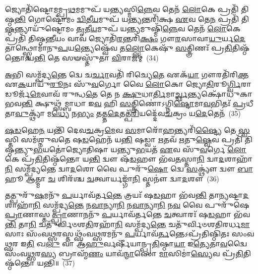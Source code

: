 {\anuvakamend[{𑌤 𑌏\-\ul{𑌕𑌾}\-𑌨𑍍𑌨𑌪᳴\-\ul{𑌞𑍍𑌚𑌾}\-𑌶𑌚𑍍𑌚᳴}]}%

𑌜𑍍𑌯𑍋𑌤𑌿᳴𑌷𑍍𑌟𑍋𑌮𑌮𑍍𑌪𑍍𑌰\-\ul{𑌥}\-𑌮𑌮𑍁𑌪᳴ 𑌯\-\ul{𑌨𑍍𑌤𑍍𑌯}\-𑌸𑍍𑌮𑌿\-\ul{𑌨𑍍𑌨𑍇}\-𑌵 𑌤𑍇𑌨᳴ \ul{𑌲𑍋}\-𑌕𑍇 𑌪𑍍𑌰𑌤𑌿᳴ 𑌤𑌿𑌷𑍍𑌠\-\ul{𑌨𑍍𑌤𑌿} 𑌗𑍋𑌷𑍍𑌟𑍋᳴𑌮𑌂 \ul{𑌦𑍍𑌵𑌿}\-𑌤𑍀\-\ul{𑌯}\-𑌮𑍁𑌪᳴ 𑌯\-\ul{𑌨𑍍𑌤𑍍𑌯}\-𑌨𑍍𑌤𑌰𑌿᳴𑌕𑍍𑌷 \ul{𑌏}\-𑌵 𑌤𑍇\-\ul{𑌨} 𑌪𑍍𑌰𑌤𑌿᳴ 𑌤𑌿\-\ul{𑌷𑍍𑌠}\-𑌨𑍍𑌤𑍍𑌯𑌾𑌯𑍁᳴𑌷𑍍𑌟𑍋𑌮𑌂 \ul{𑌤𑍃}\-𑌤𑍀\-\ul{𑌯}\-𑌮𑍁𑌪᳴ 𑌯\-\ul{𑌨𑍍𑌤𑍍𑌯}\-𑌮𑍁𑌷𑍍𑌮𑌿᳴\-\ul{𑌨𑍍𑌨𑍇}\-𑌵 𑌤𑍇𑌨᳴ \ul{𑌲𑍋}\-𑌕𑍇 𑌪𑍍𑌰𑌤𑌿᳴ 𑌤𑌿𑌷𑍍𑌠\-\ul{𑌨𑍍𑌤𑍀}\-𑌯𑌂 𑌵𑌾𑌵 𑌜𑍍𑌯𑍋𑌤𑌿᳴\-\ul{𑌰}\-𑌨𑍍𑌤𑌰𑌿᳴\-\ul{𑌕𑍍𑌷𑌂} 𑌗𑍗\-\ul{𑌰}\-𑌸𑌾𑌵𑌾\-\ul{𑌯𑍁}\-𑌰𑍍𑌯\-\ul{𑌦𑍇}\-𑌤𑌾𑌨𑍍𑌥𑍍𑌸𑍍𑌤𑍋𑌮𑌾᳴𑌨𑍁\-\ul{𑌪}\-𑌯\-\ul{𑌨𑍍𑌤𑍍𑌯𑍇}\-𑌷𑍍𑌵𑍇᳴𑌵 𑌤\-\ul{𑌲𑍍𑌲𑍋}\-𑌕𑍇𑌷𑍁᳴ \ul{𑌸}\-𑌤𑍍𑌤𑍍𑌰𑌿𑌣𑌃᳴ 𑌪𑍍𑌰\-\ul{𑌤𑌿}\-𑌤𑌿𑌷𑍍𑌠᳴𑌨𑍍𑌤𑍋 𑌯\-\ul{𑌨𑍍𑌤𑌿} 𑌤𑍇 𑌸𑍟𑌸𑍍𑌤𑍁᳴𑌤𑌾 \ul{𑌵𑌿}\-𑌰𑌾𑌜𑌮𑍍॑~(34)

\-\ul{𑌅}\-𑌭𑌿 𑌸𑌮𑍍𑌪᳴𑌦𑍍𑌯\-\ul{𑌨𑍍𑌤𑍇} 𑌦𑍍𑌵𑍇 𑌚\-\ul{𑌰𑍍𑌚𑌾}\-𑌵𑌤𑌿᳴ 𑌰𑌿𑌚𑍍𑌯𑍇\-\ul{𑌤𑍇} 𑌏𑌕᳴\-\ul{𑌯𑌾} 𑌗𑍗𑌰𑌤𑌿᳴𑌰𑌿\-\ul{𑌕𑍍𑌤} 𑌏\-\ul{𑌕}\-𑌯𑌾𑌯𑍁᳴\-\ul{𑌰𑍂}\-𑌨𑌃 𑌸𑍁᳴\-\ul{𑌵}\-𑌰𑍍𑌗𑍋 𑌵𑍈 \ul{𑌲𑍋}\-𑌕𑍋 𑌜𑍍𑌯𑍋\-\ul{𑌤𑌿}\-𑌰𑍂\-\ul{𑌰𑍍𑌗𑍍𑌵𑌿}\-𑌰𑌾𑌡𑍂𑌰𑍍𑌜᳴\-\ul{𑌮𑍇}\-𑌵𑌾𑌵᳴ 𑌰𑍁𑌨𑍍𑌧\-\ul{𑌤𑍇} 𑌤𑍇 𑌨 \ul{𑌕𑍍𑌷𑍁}\-𑌧𑌾\-\ul{𑌰𑍍𑌤𑌿}\-𑌮𑌾\-\ul{𑌰𑍍𑌚𑍍𑌛}\-𑌨𑍍𑌤𑍍𑌯𑌕𑍍𑌷𑍋᳴𑌧𑍁𑌕𑌾 𑌭𑌵\-\ul{𑌨𑍍𑌤𑌿} 𑌕𑍍𑌷𑍁𑌥𑍍𑌸᳴𑌮𑍍𑌬𑌾𑌧𑌾 𑌇\-\ul{𑌵} 𑌹𑌿 \ul{𑌸}\-𑌤𑍍𑌤𑍍𑌰𑌿𑌣𑍋॑\-𑌽𑌗𑍍𑌨𑌿\-\ul{𑌷𑍍𑌟𑍋}\-𑌮𑌾\-\ul{𑌵}\-𑌭𑌿𑌤𑌃᳴ \ul{𑌪𑍍𑌰}\-𑌧𑍀 𑌤𑌾\-\ul{𑌵𑍁}\-𑌕𑍍𑌥𑍍𑌯𑌾᳴ 𑌮\-\ul{𑌧𑍍𑌯𑍇} 𑌨\-\ul{𑌭𑍍𑌯𑌂} 𑌤𑌤𑍍𑌤\-\ul{𑌦𑍇}\-𑌤𑌤𑍍𑌪᳴\-\ul{𑌰𑌿}\-𑌯𑌦𑍍𑌦𑍇᳴𑌵\-\ul{𑌚}\-𑌕𑍍𑌰𑌂 𑌯\-\ul{𑌦𑍇}\-𑌤𑍇𑌨᳴~(35)

\-\ul{𑌷}\-\-\ul{𑌡}\-𑌹𑍇\-\ul{𑌨} 𑌯𑌨𑍍𑌤𑌿᳴ 𑌦𑍇𑌵\-\ul{𑌚}\-𑌕𑍍𑌰\-\ul{𑌮𑍇}\-𑌵 \ul{𑌸}\-𑌮𑌾𑌰𑍋᳴\-\ul{𑌹}\-𑌨𑍍𑌤𑍍𑌯𑌰𑌿᳴\-\ul{𑌷𑍍𑌟𑍍𑌯𑍈} 𑌤𑍇 \ul{𑌸𑍍𑌵}\-𑌸𑍍𑌤𑌿 𑌸𑌮᳴𑌶𑍍𑌨𑍁𑌵𑌤𑍇 𑌷\-\ul{𑌡}\-𑌹𑍇𑌨᳴ 𑌯\-\ul{𑌨𑍍𑌤𑌿} 𑌷𑌡𑍍𑌵𑌾 \ul{𑌋}\-𑌤𑌵᳴ \ul{𑌋}\-𑌤𑍁\-\ul{𑌷𑍍𑌵𑍇}\-𑌵 𑌪𑍍𑌰𑌤𑌿᳴ 𑌤𑌿𑌷𑍍𑌠𑌨𑍍𑌤𑍍𑌯𑍁\-\ul{𑌭}\-𑌯𑌤𑍋॑𑌜𑍍𑌯𑍋𑌤𑌿𑌷𑌾 𑌯𑌨𑍍𑌤𑍍𑌯𑍁\-\ul{𑌭}\-𑌯𑌤᳴ \ul{𑌏}\-𑌵 𑌸𑍁᳴\-\ul{𑌵}\-𑌰𑍍𑌗𑍇 \ul{𑌲𑍋}\-𑌕𑍇 𑌪𑍍𑌰᳴\-\ul{𑌤𑌿}\-𑌤𑌿𑌷𑍍𑌠᳴𑌨𑍍𑌤𑍋 𑌯\-\ul{𑌨𑍍𑌤𑌿} 𑌦𑍍𑌵𑍗 𑌷᳴\-\ul{𑌡}\-𑌹𑍗 𑌭᳴𑌵\-\ul{𑌤}\-𑌸𑍍𑌤𑌾\-\ul{𑌨𑌿} 𑌦𑍍𑌵𑌾\-\ul{𑌦}\-𑌶𑌾𑌹𑌾᳴\-\ul{𑌨𑌿} 𑌸𑌮𑍍𑌪᳴𑌦𑍍𑌯𑌨𑍍𑌤𑍇 𑌦𑍍𑌵𑌾\-\ul{𑌦}\-𑌶𑍋 𑌵𑍈 𑌪𑍁𑌰𑍁᳴\-\ul{𑌷𑍋} 𑌦𑍍𑌵𑍇 \ul{𑌸}\-𑌕𑍍𑌥𑍍𑌯𑍗॑ 𑌦𑍍𑌵𑍗 \ul{𑌬𑌾}\-𑌹𑍂 \ul{𑌆}\-𑌤𑍍𑌮𑌾 \ul{𑌚} 𑌶𑌿𑌰᳴𑌶𑍍𑌚 \ul{𑌚}\-𑌤𑍍𑌵𑌾𑌰𑍍𑌯𑌙𑍍𑌗𑌾᳴\-\ul{𑌨𑌿} 𑌸𑍍𑌤𑌨𑍗॑ 𑌦𑍍𑌵𑌾\-\ul{𑌦}\-𑌶𑍗~(36)

𑌤𑌤𑍍𑌪𑍁𑌰𑍁᳴\-\ul{𑌷}\-𑌮𑌨𑍁᳴ \ul{𑌪}\-𑌰𑍍𑌯𑌾𑌵᳴𑌰𑍍𑌤\-\ul{𑌨𑍍𑌤𑍇} 𑌤𑍍𑌰𑌯𑌃᳴ 𑌷\-\ul{𑌡}\-𑌹𑌾 𑌭᳴𑌵\-\ul{𑌨𑍍𑌤𑌿} 𑌤𑌾\-\ul{𑌨𑍍𑌯}\-𑌷𑍍𑌟𑌾\-\ul{𑌦}\-𑌶𑌾𑌹𑌾᳴\-\ul{𑌨𑌿} 𑌸𑌮𑍍𑌪᳴𑌦𑍍𑌯\-\ul{𑌨𑍍𑌤𑍇} 𑌨\-\ul{𑌵𑌾}\-𑌨𑍍𑌯𑌾\-\ul{𑌨𑌿} 𑌨\-\ul{𑌵𑌾}\-𑌨𑍍𑌯𑌾\-\ul{𑌨𑌿} 𑌨\-\ul{𑌵} 𑌵𑍈 𑌪𑍁𑌰𑍁᳴𑌷𑍇 \ul{𑌪𑍍𑌰𑌾}\-𑌣𑌾𑌸𑍍𑌤\-\ul{𑌤𑍍𑌪𑍍𑌰𑌾}\-𑌣𑌾𑌨𑌨𑍁᳴ \ul{𑌪}\-𑌰𑍍𑌯𑌾𑌵᳴𑌰𑍍𑌤𑌨𑍍𑌤𑍇 \ul{𑌚}\-𑌤𑍍𑌵𑌾𑌰𑌃᳴ 𑌷\-\ul{𑌡}\-𑌹𑌾 𑌭᳴𑌵\-\ul{𑌨𑍍𑌤𑌿} 𑌤𑌾\-\ul{𑌨𑌿} 𑌚𑌤𑍁᳴𑌰𑍍𑌵𑌿𑍞𑌶\-\ul{𑌤𑌿}\-𑌰𑌹𑌾᳴\-\ul{𑌨𑌿} 𑌸𑌮𑍍𑌪᳴𑌦𑍍𑌯\-\ul{𑌨𑍍𑌤𑍇} 𑌚𑌤𑍁᳴𑌰𑍍𑌵𑌿𑍞𑌶𑌤𑌿𑌰𑌰𑍍𑌧\-\ul{𑌮𑌾}\-𑌸𑌾𑌃 𑌸𑌂᳴𑌵\-\ul{𑌥𑍍𑌸}\-𑌰𑌸𑍍𑌤𑌥𑍍𑌸𑌂᳴𑌵\-\ul{𑌥𑍍𑌸}\-𑌰𑌮𑌨𑍁᳴ \ul{𑌪}\-𑌰𑍍𑌯𑌾𑌵᳴\-\ul{𑌰𑍍𑌤}\-𑌨𑍍𑌤𑍇\-𑌽𑌪𑍍𑌰᳴𑌤𑌿𑌷𑍍𑌠𑌿𑌤𑌃 𑌸𑌂𑌵\-\ul{𑌥𑍍𑌸}\-𑌰 𑌇\-\ul{𑌤𑌿} 𑌖\-\ul{𑌲𑍁} 𑌵𑌾 𑌆᳴\-\ul{𑌹𑍁}\-𑌰𑍍𑌵𑌰𑍍\mbox{}𑌷𑍀᳴𑌯𑌾𑌨𑍍𑌪𑍍𑌰\-\ul{𑌤𑌿}\-𑌷𑍍𑌠𑌾\-\ul{𑌯𑌾} 𑌇\-\ul{𑌤𑍍𑌯𑍇}\-𑌤𑌾\-\ul{𑌵}\-𑌦𑍍𑌵𑍈 𑌸𑌂᳴𑌵\-\ul{𑌥𑍍𑌸}\-𑌰\-\ul{𑌸𑍍𑌯} 𑌬𑍍𑌰𑌾𑌹𑍍𑌮᳴\-\ul{𑌣𑌂} 𑌯𑌾𑌵᳴\-\ul{𑌨𑍍𑌮𑌾}\-𑌸𑍋 \ul{𑌮𑌾}\-𑌸𑌿𑌮𑌾॑\-\ul{𑌸𑍍𑌯𑍇}\-𑌵 𑌪𑍍𑌰᳴\-\ul{𑌤𑌿}\-𑌤𑌿𑌷𑍍𑌠᳴𑌨𑍍𑌤𑍋 𑌯𑌨𑍍𑌤𑌿॥~(37)

